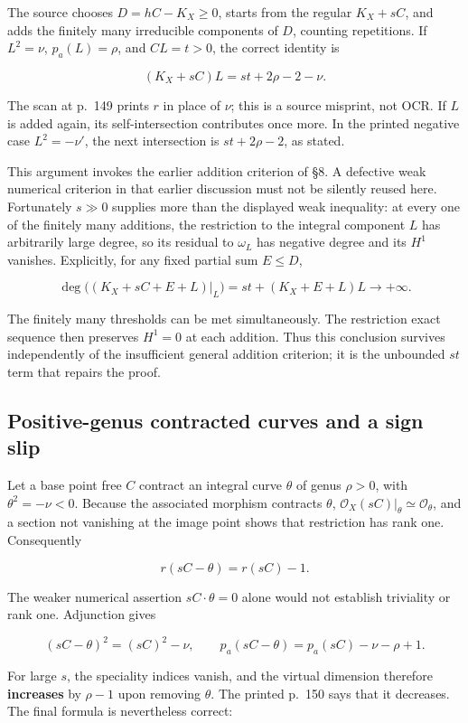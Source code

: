 The source chooses \(D=hC-K_X\ge0\), starts from the regular \(K_X+sC\), and adds the finitely many irreducible components of \(D\), counting repetitions. If \(L^2=\nu\), \(p_a(L)=\rho\), and \(C L=t>0\), the correct identity is

\[
(K_X+sC)L=st+2\rho-2-\nu.
\tag{IV.15.5}
\]

The scan at p.~149 prints \(r\) in place of \(\nu\); this is a source misprint, not OCR. If \(L\) is added again, its self-intersection contributes once more. In the printed negative case \(L^2=-\nu'\), the next intersection is \(st+2\rho-2\), as stated.

This argument invokes the earlier addition criterion of §8. A defective weak numerical criterion in that earlier discussion must not be silently reused here. Fortunately \(s\gg0\) supplies more than the displayed weak inequality: at every one of the finitely many additions, the restriction to the integral component \(L\) has arbitrarily large degree, so its residual to \(\omega_L\) has negative degree and its \(H^1\) vanishes. Explicitly, for any fixed partial sum \(E\le D\),

\[
\deg\bigl((K_X+sC+E+L)|_L\bigr)
=st+(K_X+E+L)L\longrightarrow+\infty.
\]

The finitely many thresholds can be met simultaneously. The restriction exact sequence then preserves \(H^1=0\) at each addition. Thus this conclusion survives independently of the insufficient general addition criterion; it is the unbounded \(st\) term that repairs the proof.

\subsection{Positive-genus contracted curves and a sign slip}

Let a base point free \(C\) contract an integral curve \(\theta\) of genus \(\rho>0\), with \(\theta^2=-\nu<0\). Because the associated morphism contracts \(\theta\), \(\mathcal O_X(sC)|_\theta\simeq\mathcal O_\theta\), and a section not vanishing at the image point shows that restriction has rank one. Consequently

\[
r(sC-\theta)=r(sC)-1.
\]

The weaker numerical assertion \(sC\cdot\theta=0\) alone would not establish triviality or rank one. Adjunction gives

\[
(sC-\theta)^2=(sC)^2-\nu,
\qquad
p_a(sC-\theta)=p_a(sC)-\nu-\rho+1.
\]

For large \(s\), the speciality indices vanish, and the virtual dimension therefore \textbf{increases} by \(\rho-1\) upon removing \(\theta\). The printed p.~150 says that it decreases. The final formula is nevertheless correct:

